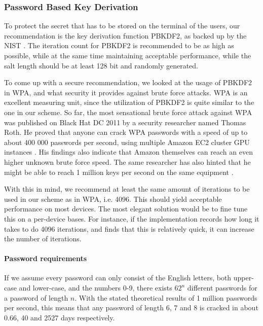 \documentclass[pdftex,english,10pt,b5paper,twoside]{book}
\begin{document}
\subsubsection{Password Based Key Derivation} 
\label{sec:PBKD}

To protect the secret that has to be stored on the terminal of the users, our
recommendation is the key derivation function \ac{PBKDF2}, as backed up by the
\ac{NIST} \cite{pbkdf_nist}. The iteration count for \ac{PBKDF2} is recommended
to be as high as possible, while at the same time maintaining acceptable
performance, while the salt length should be at least 128 bit and randomly
generated. 

To come up with a secure recommendation, we looked at the usage of \ac{PBKDF2}
in \ac{WPA}, and what security it provides against brute force attacks.
\ac{WPA} is an excellent measuring unit, since the utilization of \ac{PBKDF2}
is quite similar to the one in our scheme. So far, the most sensational brute
force attack against \ac{WPA} was published on Black Hat DC 2011 by a security
researcher named Thomas Roth. He proved that anyone can crack \ac{WPA}
passwords with a speed of up to about 400 000 passwords per second, using
multiple Amazon \ac{EC2} cluster \ac{GPU} instances \cite{rothwpa}. His
findings also indicate that Amazon themselves can reach an even higher unknown
brute force speed. The same researcher has also hinted that he might be able to
reach 1 million keys per second on the same equipment \cite{rothblog}.

With this in mind, we recommend at least the same amount of iterations to be
used in our scheme as in \ac{WPA}, i.e. 4096. This should yield acceptable
performance on most devices. The most elegant solution would be to fine tune
this on a per-device bases. For instance, if the implementation records how long
it takes to do 4096 iterations, and finds that this is relatively quick, it can
increase the number of iterations.

\paragraph{Password requirements}

If we assume every password can only consist of the English letters, both
upper-case and lower-case, and the numbers 0-9, there exists $62^n$ different
passwords for a password of length $n$. With the stated theoretical results of
1 million passwords per second, this means that any password of length 6, 7 and
8 is cracked in about 0.66, 40 and 2527 days respectively.
\end{document}
